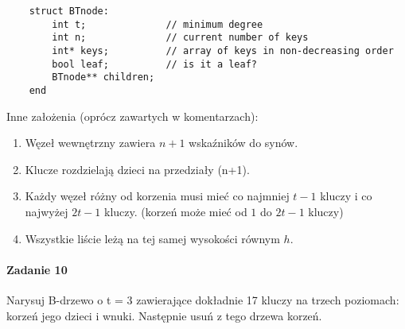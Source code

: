 \documentclass[18pt]{extarticle}
\begin{document}
\begin{lstlisting}
    struct BTnode:
        int t;              // minimum degree
        int n;              // current number of keys
        int* keys;          // array of keys in non-decreasing order
        bool leaf;          // is it a leaf?
        BTnode** children;
    end
\end{lstlisting}
Inne założenia (oprócz zawartych w komentarzach):
\begin{enumerate}
    \item Węzeł wewnętrzny zawiera $n+1$ wskaźników do synów.
    \item Klucze rozdzielają dzieci na przedziały (n+1).
    \item Każdy węzeł różny od korzenia musi mieć co najmniej $t-1$ kluczy i co najwyżej $2t-1$ kluczy. (korzeń może mieć od $1$ do $2t-1$ kluczy)
    \item Wszystkie liście leżą na tej samej wysokości równym $h$.
\end{enumerate}

\paragraph{Zadanie 10} Narysuj B-drzewo o t = 3 zawierające dokładnie 17 kluczy na trzech poziomach: korzeń jego dzieci i wnuki. Następnie usuń z tego drzewa korzeń.
\end{document}
